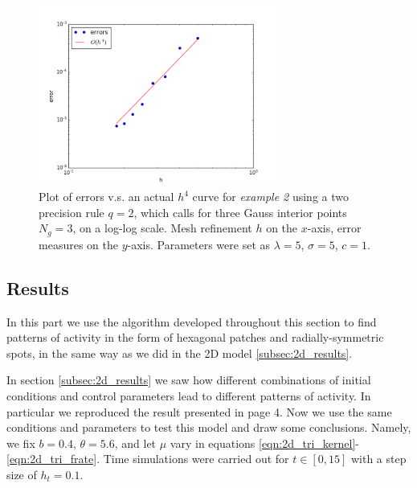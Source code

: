 \documentclass{uonmathreport}
\begin{document}
\begin{figure}[H]
	\begin{center}
		\includegraphics[width=0.7\textwidth]{Figures/2dTriTest2_case3.png}
	\end{center}
	\caption{Plot of errors v.s. an actual $h^4$ curve for \textit{example 2} using a two precision rule $q=2$, which calls for three Gauss interior points $N_g=3$, on a log-log scale. Mesh refinement $h$ on the $x$-axis, error measures on the $y$-axis. Parameters were set as $\lambda=5$, $\sigma=5$, $c=1$.}
	\label{fig:2dTri_Errors_test2_case3}
\end{figure}


\subsection{Results} \label{subsec:tri_results}
In this part we use the algorithm developed throughout this section to find patterns of activity in the form of hexagonal patches and radially-symmetric spots, in the same way as we did in the 2D model \ref{subsec:2d_results}.

In section \ref{subsec:2d_results} we saw how different combinations of initial conditions and control parameters lead to different patterns of activity. In particular we reproduced the result presented in \cite{rankin2014continuation} page 4. Now we use the same conditions and parameters to test this model and draw some conclusions. Namely, we fix $b=0.4$, $\theta=5.6$, and let $\mu$ vary in equations \ref{eqn:2d_tri_kernel}-\ref{eqn:2d_tri_frate}. Time simulations were carried out for $t \in [0,15]$ with a step size of $h_t=0.1$.
\end{document}
